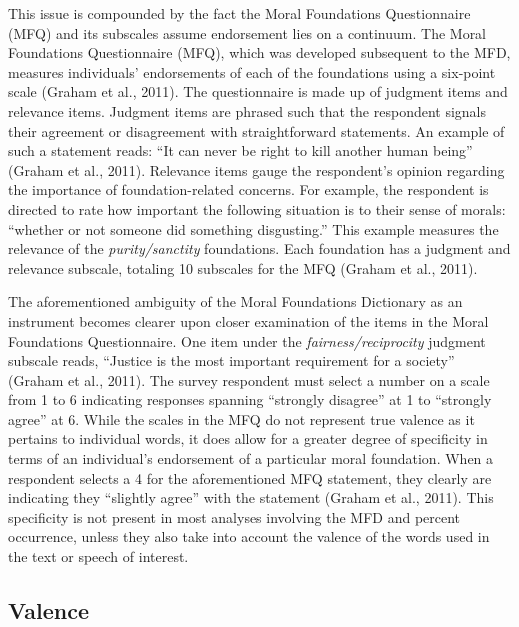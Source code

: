 \documentclass[,man]{apa6}
\begin{document}
This issue is compounded by the fact the Moral Foundations Questionnaire
(MFQ) and its subscales assume endorsement lies on a continuum. The
Moral Foundations Questionnaire (MFQ), which was developed subsequent to
the MFD, measures individuals' endorsements of each of the foundations
using a six-point scale (Graham et al., 2011). The questionnaire is made
up of judgment items and relevance items. Judgment items are phrased
such that the respondent signals their agreement or disagreement with
straightforward statements. An example of such a statement reads:
\enquote{It can never be right to kill another human being} (Graham et
al., 2011). Relevance items gauge the respondent's opinion regarding the
importance of foundation-related concerns. For example, the respondent
is directed to rate how important the following situation is to their
sense of morals: \enquote{whether or not someone did something
disgusting.} This example measures the relevance of the
\emph{purity/sanctity} foundations. Each foundation has a judgment and
relevance subscale, totaling 10 subscales for the MFQ (Graham et al.,
2011).

The aforementioned ambiguity of the Moral Foundations Dictionary as an
instrument becomes clearer upon closer examination of the items in the
Moral Foundations Questionnaire. One item under the
\emph{fairness/reciprocity} judgment subscale reads, \enquote{Justice is
the most important requirement for a society} (Graham et al., 2011). The
survey respondent must select a number on a scale from 1 to 6 indicating
responses spanning \enquote{strongly disagree} at 1 to \enquote{strongly
agree} at 6. While the scales in the MFQ do not represent true valence
as it pertains to individual words, it does allow for a greater degree
of specificity in terms of an individual's endorsement of a particular
moral foundation. When a respondent selects a 4 for the aforementioned
MFQ statement, they clearly are indicating they \enquote{slightly agree}
with the statement (Graham et al., 2011). This specificity is not
present in most analyses involving the MFD and percent occurrence,
unless they also take into account the valence of the words used in the
text or speech of interest.

\subsection{Valence}\label{valence}
\end{document}
